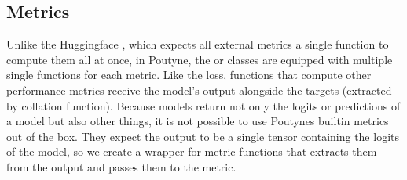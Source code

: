 \documentclass[letterpaper,10pt,english]{jupyterBook}
\begin{document}
\subsection{Metrics}
\label{\detokenize{Poutyne:id5}}
\sphinxAtStartPar
Unlike the Huggingface , which expects all external metrics a single function to compute them all at once, in Poutyne, the  or  classes are equipped with multiple single functions for each metric.
Like the loss, functions that compute other performance metrics receive the model’s output alongside the targets (extracted by collation function).
Because  models return not only the logits or predictions of a model but also other things, it is not possible to use Poutynes built\sphinxhyphen{}in metrics out of the box.
They expect the output to be a single tensor containing the logits of the model, so we create a wrapper for metric functions that extracts them from the output and passes them to the metric.
\end{document}
